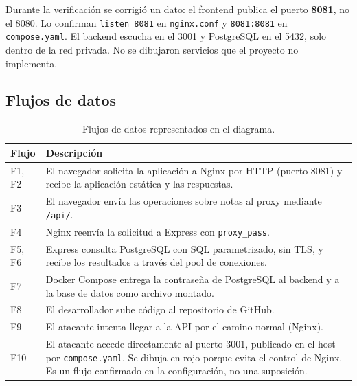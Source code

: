 Durante la verificación se corrigió un dato: el frontend publica el puerto
\textbf{8081}, no el 8080. Lo confirman \texttt{listen 8081} en
\texttt{nginx.conf} y \texttt{8081:8081} en \texttt{compose.yaml}. El backend
escucha en el 3001 y PostgreSQL en el 5432, solo dentro de la red privada.
No se dibujaron servicios que el proyecto no implementa.

\subsection{Flujos de datos}

\begin{table}[H]
\centering
\caption{Flujos de datos representados en el diagrama.}
\label{tab:flujos}

\begin{tabularx}{\textwidth}{l X}
\toprule
\textbf{Flujo} &
\textbf{Descripción} \\
\midrule
F1, F2 &
El navegador solicita la aplicación a Nginx por HTTP (puerto 8081) y
recibe la aplicación estática y las respuestas. \\

F3 &
El navegador envía las operaciones sobre notas al proxy mediante
\texttt{/api/}. \\

F4 &
Nginx reenvía la solicitud a Express con \texttt{proxy\_pass}. \\

F5, F6 &
Express consulta PostgreSQL con SQL parametrizado, sin TLS, y recibe los
resultados a través del pool de conexiones. \\

F7 &
Docker Compose entrega la contraseña de PostgreSQL al backend y a la base de
datos como archivo montado. \\

F8 &
El desarrollador sube código al repositorio de GitHub. \\

F9 &
El atacante intenta llegar a la API por el camino normal (Nginx). \\

F10 &
El atacante accede directamente al puerto 3001, publicado en el host por
\texttt{compose.yaml}. Se dibuja en rojo porque evita el control de Nginx.
Es un flujo confirmado en la configuración, no una suposición. \\
\bottomrule
\end{tabularx}
\end{table}

